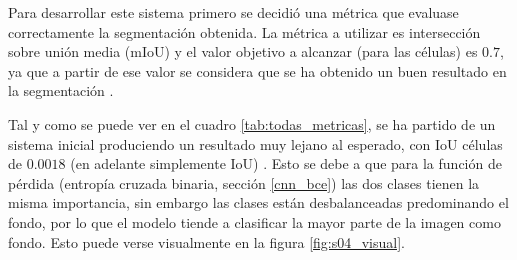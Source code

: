 
Para desarrollar este sistema primero se decidió una métrica que evaluase correctamente la segmentación obtenida. La métrica a utilizar es intersección sobre unión media (mIoU) y el valor objetivo a alcanzar (para las células) es $0.7$, ya que a partir de ese valor se considera que se ha obtenido un buen resultado en la segmentación \cite{Falk2019}.

Tal y como se puede ver en el cuadro \ref{tab:todas_metricas}, se ha partido de un sistema inicial produciendo un resultado muy lejano al esperado, con IoU células de $0.0018$ (en adelante simplemente IoU) . Esto se debe a que para la función de pérdida (entropía cruzada binaria, sección \ref{cnn_bce}) las dos clases tienen la misma importancia, sin embargo las clases están desbalanceadas predominando el fondo, por lo que el modelo tiende a clasificar la mayor parte de la imagen como fondo. Esto puede verse visualmente en la figura \ref{fig:s04_visual}.


